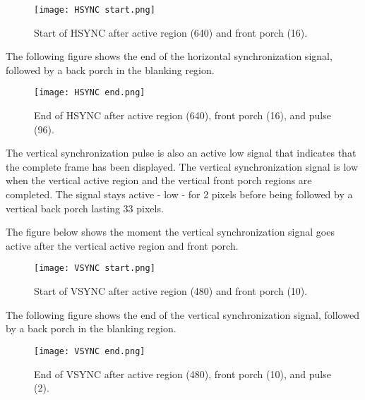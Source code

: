 \begin{figure}[H]
	\centering
	\texttt{[image: HSYNC start.png]}
	\caption{ Start of HSYNC after active region (640) and front porch (16).  }
	\label{fig:HSYNCStart}  
\end{figure}

\par The following figure shows the end of the horizontal synchronization signal, followed by a back porch in the blanking region. \newline

\begin{figure}[H]
	\centering
	\texttt{[image: HSYNC end.png]}
	\caption{ End of HSYNC after active region (640), front porch (16), and pulse (96). }
	\label{fig:HSYNCEnd}  
\end{figure}

\par The vertical synchronization pulse is also an active low signal that indicates that the complete frame has been displayed. The vertical synchronization signal is low when the vertical active region and the vertical front porch regions are completed. The signal stays active - low - for 2 pixels before being followed by a vertical back porch lasting 33 pixels. \newline
\par The figure below shows the moment the vertical synchronization signal goes active after the vertical active region and front porch. \newline

\begin{figure}[H]
	\centering
	\texttt{[image: VSYNC start.png]}
	\caption{ Start of VSYNC after active region (480) and front porch (10). }
	\label{fig:VSYNCStart}  
\end{figure}

\par The following figure shows the end of the vertical synchronization signal, followed by a back porch in the blanking region. \newline

\begin{figure}[H]
	\centering
	\texttt{[image: VSYNC end.png]}
	\caption{ End of VSYNC after active region (480), front porch (10), and pulse (2). }
	\label{fig:VSYNCEnd}  
\end{figure}

